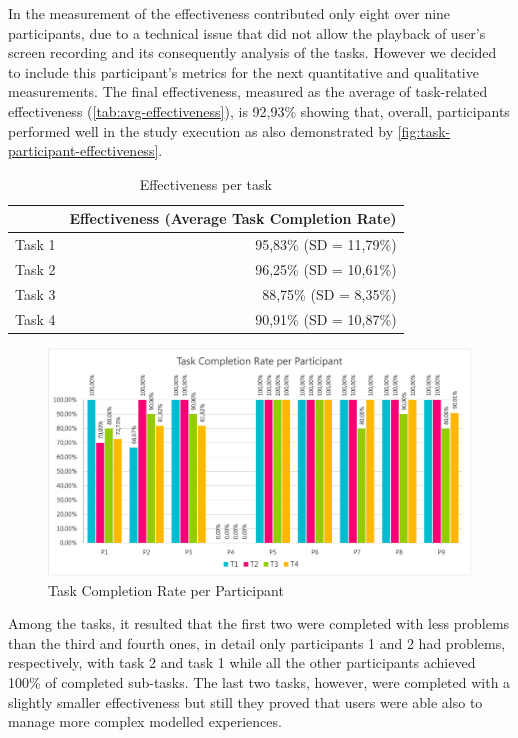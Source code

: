 In the measurement of the effectiveness contributed only eight over nine participants, due to a technical issue that did not allow the playback of user's screen recording and its consequently analysis of the tasks. However we decided to include this participant's metrics for the next quantitative and qualitative measurements. The final effectiveness, measured as the average of task-related effectiveness (\autoref{tab:avg-effectiveness}), is 92,93\% showing that, overall, participants performed well in the study execution as also demonstrated by \autoref{fig:task-participant-effectiveness}.
\begin{table}[H]
    \centering
    \begin{tabular}{lr}
    \hline
           & \multicolumn{1}{l}{Effectiveness (Average Task Completion Rate)} \\ \hline
    Task 1 & 95,83\% (SD = 11,79\%)                                           \\
    Task 2 & 96,25\% (SD = 10,61\%)                                           \\
    Task 3 & 88,75\% (SD = 8,35\%)                                            \\
    Task 4 & 90,91\% (SD = 10,87\%)                                           \\ \hline
    \end{tabular}
    \caption{Effectiveness per task}
    \label{tab:avg-effectiveness}
\end{table}

\begin{figure}[H]
    \centering
    \includegraphics[width=\linewidth]{Figures/Evaluation/results/task-completion-rate_per-participant.png}
    \caption{Task Completion Rate per Participant}
    \label{fig:task-participant-effectiveness}
\end{figure}
Among the tasks, it resulted that the first two were completed with less problems than the third and fourth ones, in detail only participants 1 and 2 had problems, respectively, with task 2 and task 1 while all the other participants achieved 100\% of completed sub-tasks. The last two tasks, however, were completed with a slightly smaller effectiveness but still they proved that users were able also to manage more complex modelled experiences.

